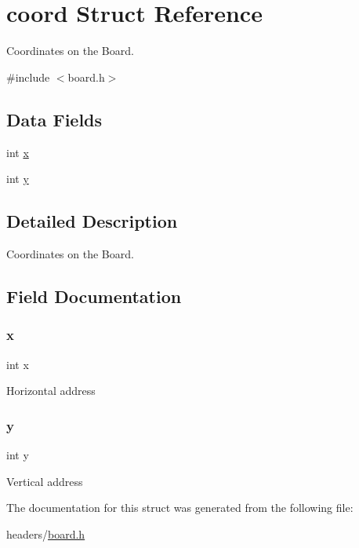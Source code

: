 \hypertarget{structcoord}{}\section{coord Struct Reference}
\label{structcoord}


Coordinates on the Board.  




{\ttfamily \#include $<$board.\+h$>$}

\subsection*{Data Fields}
\begin{DoxyCompactItemize}
\item 
int \hyperlink{structcoord_a6150e0515f7202e2fb518f7206ed97dc}{x}
\item 
int \hyperlink{structcoord_a0a2f84ed7838f07779ae24c5a9086d33}{y}
\end{DoxyCompactItemize}


\subsection{Detailed Description}
Coordinates on the Board. 

\subsection{Field Documentation}
\mbox{\label{structcoord_a6150e0515f7202e2fb518f7206ed97dc}} 
\subsubsection{\texorpdfstring{x}{x}}
{\footnotesize\ttfamily int x}

Horizontal address \mbox{\label{structcoord_a0a2f84ed7838f07779ae24c5a9086d33}} 
\subsubsection{\texorpdfstring{y}{y}}
{\footnotesize\ttfamily int y}

Vertical address 

The documentation for this struct was generated from the following file\+:\begin{DoxyCompactItemize}
\item 
headers/\hyperlink{board_8h}{board.\+h}\end{DoxyCompactItemize}
